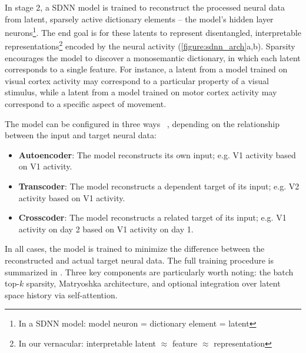 In stage 2, a SDNN model is trained to reconstruct the processed neural data from latent, sparsely active dictionary elements -- the model's hidden layer neurons\footnote{In a SDNN model: model neuron = dictionary element = latent}. The end goal is for these latents to represent disentangled, interpretable representations\footnote{In our vernacular: interpretable latent $\approx$ feature $\approx$ representation} encoded by the neural activity (\autoref{figure:sdnn_arch}a,b). Sparsity encourages the model to discover a monosemantic dictionary, in which each latent corresponds to a single feature. For instance, a latent from a model trained on visual cortex activity may correspond to a particular property of a visual stimulus, while a latent from a model trained on motor cortex activity may correspond to a specific aspect of movement.

The model can be configured in three ways ~\cite{lindsey_2024_crosscoders}, depending on the relationship between the input and target neural data:
\begin{itemize}[nosep, leftmargin=1em, topsep=-0.5em]
    \item \textbf{Autoencoder}: The model reconstructs its own input; e.g. V1 activity based on V1 activity.
    \item \textbf{Transcoder}: The model reconstructs a dependent target of its input; e.g. V2 activity based on V1 activity.
    \item \textbf{Crosscoder}: The model reconstructs a related target of its input; e.g. V1 activity on day 2 based on V1 activity on day 1.
\end{itemize}
In all cases, the model is trained to minimize the difference between the reconstructed and actual target neural data. The full training procedure is summarized in . Three key components are particularly worth noting: the batch top-$k$ sparsity, Matryoshka architecture, and optional integration over latent space history via self-attention.

